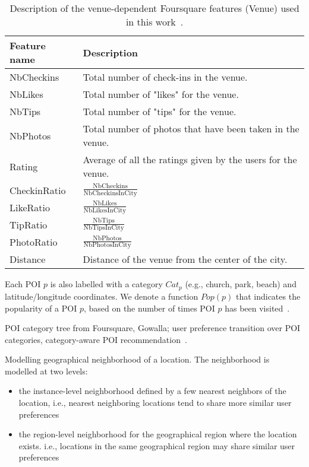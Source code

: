 \documentclass[9pt]{extarticle}
\begin{document}
\begin{table}[ht]
\caption{Description of the venue-dependent Foursquare features (Venue) used in this work~\cite{deveaud2014importance}.}
\centering
\begin{tabular}{l|m{}} \hline
\textbf{Feature name} & \textbf{Description} \\ \hline
NbCheckins & Total number of check-ins in the venue. \\ \hline
NbLikes    & Total number of "likes" for the venue. \\ \hline
NbTips     & Total number of "tips" for the venue. \\ \hline
NbPhotos   & Total number of photos that have been taken in the venue. \\ \hline
Rating     & Average of all the ratings given by the users for the venue. \\ \hline
CheckinRatio & $\frac{\text{NbCheckins}}{\text{NbCheckinsInCity}}$ \\ \hline
LikeRatio    & $\frac{\text{NbLikes}}{\text{NbLikesInCity}}$ \\ \hline
TipRatio     & $\frac{\text{NbTips}}{\text{NbTipsInCity}}$ \\ \hline
PhotoRatio   & $\frac{\text{NbPhotos}}{\text{NbPhotosInCity}}$ \\ \hline
Distance     & Distance of the venue from the center of the city. \\ \hline
\end{tabular}
\end{table}


Each POI $p$ is also labelled with a category $Cat_p$ (e.g., church, park, beach) and latitude/longitude coordinates. 
We denote a function $Pop(p)$ that indicates the popularity of a POI $p$, based on the number of times POI $p$ has been visited~\cite{ijcai15}.

POI category tree from Foursquare, Gowalla; user preference transition over POI categories, category-aware POI recommendation~\cite{liu2013personalized}.

Modelling geographical neighborhood of a location. The neighborhood is modelled at two levels:~\cite{liu2014exploiting}
\begin{itemize}
\item the instance-level neighborhood defined by a few nearest neighbors of the location, 
      i.e., nearest neighboring locations tend to share more similar user preferences
\item the region-level neighborhood for the geographical region where the location exists. 
      i.e., locations in the same geographical region may share similar user preferences
\end{itemize}



\end{document}
